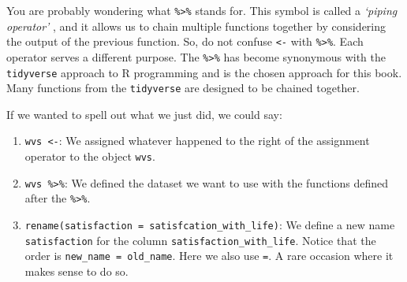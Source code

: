 \documentclass[
]{book}
\newenvironment{Shaded}{\begin{snugshade}}{\end{snugshade}}
\newcommand{\AttributeTok}[1]{\textcolor[rgb]{0.77,0.63,0.00}{#1}}
\newcommand{\DocumentationTok}[1]{\textcolor[rgb]{0.56,0.35,0.01}{\textbf{\textit{#1}}}}
\newcommand{\FunctionTok}[1]{\textcolor[rgb]{0.00,0.00,0.00}{#1}}
\newcommand{\NormalTok}[1]{#1}
\newcommand{\OtherTok}[1]{\textcolor[rgb]{0.56,0.35,0.01}{#1}}
\newcommand{\SpecialCharTok}[1]{\textcolor[rgb]{0.00,0.00,0.00}{#1}}
\begin{document}
\begin{Shaded}
\end{Shaded}

You are probably wondering what \texttt{\%\textgreater{}\%} stands for. This symbol is called a \emph{`piping operator'} , and it allows us to chain multiple functions together by considering the output of the previous function. So, do not confuse \texttt{\textless{}-} with \texttt{\%\textgreater{}\%}. Each operator serves a different purpose. The \texttt{\%\textgreater{}\%} has become synonymous with the \texttt{tidyverse} approach to R programming and is the chosen approach for this book. Many functions from the \texttt{tidyverse} are designed to be chained together.

If we wanted to spell out what we just did, we could say:

\begin{enumerate}
\def\labelenumi{\arabic{enumi}.}
\item
  \texttt{wvs\ \textless{}-}: We assigned whatever happened to the right of the assignment operator to the object \texttt{wvs}.
\item
  \texttt{wvs\ \%\textgreater{}\%}: We defined the dataset we want to use with the functions defined after the \texttt{\%\textgreater{}\%}.
\item
  \texttt{rename(satisfaction\ =\ satisfcation\_with\_life)}: We define a new name \texttt{satisfaction} for the column \texttt{satisfaction\_with\_life}. Notice that the order is \texttt{new\_name\ =\ old\_name}. Here we also use \texttt{=}. A rare occasion where it makes sense to do so.
\end{enumerate}
\end{document}
